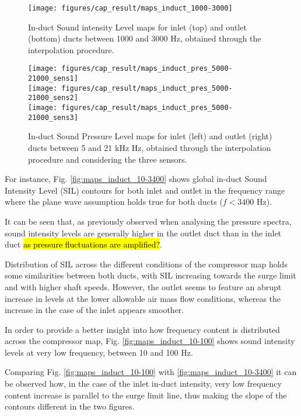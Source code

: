 \begin{figure}[tbh!]
\centering
\texttt{[image: figures/cap\_result/maps\_induct\_1000-3000]}
\vspace{-2.25cm}
\caption{In-duct Sound intensity Level maps for inlet (top) and outlet (bottom) ducts between 1000 and 3000 Hz, obtained through the interpolation procedure.}
\label{fig:maps_induct_1000-3000}
\end{figure}

\begin{figure}[tbh!]
\centering
\texttt{[image: figures/cap\_result/maps\_induct\_pres\_5000-21000\_sens1]}\\[4mm]
\texttt{[image: figures/cap\_result/maps\_induct\_pres\_5000-21000\_sens2]}\\[4mm]
\texttt{[image: figures/cap\_result/maps\_induct\_pres\_5000-21000\_sens3]}
\caption{In-duct Sound Pressure Level maps for inlet (left) and outlet (right) ducts between 5 and 21 kHz Hz, obtained through the interpolation procedure and considering the three sensors.}
\label{fig:maps_induct_SPL_3sens}
\end{figure}

For instance, Fig. \ref{fig:maps_induct_10-3400} shows global in-duct Sound Intensity Level (SIL) contours for both inlet and outlet in the frequency range where the plane wave assumption holds true for both ducts ($f<3400$ Hz). 

It can be seen that, as previously observed when analysing the pressure spectra, sound intensity levels are generally higher in the outlet duct than in the inlet duct \hl{as pressure fluctuations are amplified?}. 

Distribution of SIL across the different conditions of the compressor map holds some similarities between both ducts, with SIL increasing towards the surge limit and with higher shaft speeds. However, the outlet seems to feature an abrupt increase in levels at the lower allowable air mass flow conditions, whereas the increase in the case of the inlet appears smoother. 

In order to provide a better insight into how frequency content is distributed across the compressor map, Fig. \ref{fig:maps_induct_10-100} shows sound intensity levels at very low frequency, between 10 and 100 Hz.

Comparing Fig. \ref{fig:maps_induct_10-100} with \ref{fig:maps_induct_10-3400} it can be observed how, in the case of the inlet in-duct intensity, very low frequency content increase is parallel to the surge limit line, thus making the slope of the contours different in the two figures.


